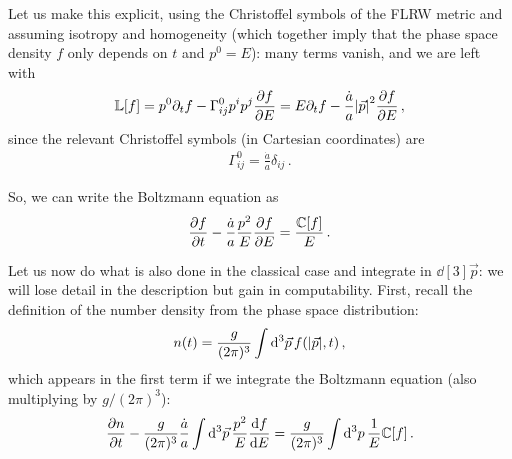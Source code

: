 \documentclass[main.tex]{subfiles}
\begin{document}
Let us make this explicit, using the Christoffel symbols of the FLRW metric and assuming isotropy and homogeneity (which together imply that the phase space density \(f\) only depends on \(t\) and \(p^{0} = E\)): many terms vanish, and we are left with
%
\begin{align}
\mathbb{L}[f]  
= p^{0} \partial_{t}f - \Gamma^{0}_{ij} p^{i} p^{j} \pdv{f}{E}
= E \partial_t f - \frac{\dot{a}}{a} \abs{\vec{p}}^2 \pdv{f}{E}
\,,
\end{align}
%
since the relevant Christoffel symbols (in Cartesian coordinates) are 
%
\begin{align}
  \Gamma^{0}_{ij } = \frac{\dot{a}}{a} \delta_{ij }
\,.
\end{align}

So, we can write the Boltzmann equation as 
%
\begin{align}
\pdv{f}{t} - \frac{\dot{a}}{a} \frac{p^2}{E} \pdv{f}{E} = \frac{\mathbb{C} [f]}{E}
\,.
\end{align}



Let us now do what is also done in the classical case and integrate in \(\dd[3]{\vec{p}}\): we will lose detail in the description but gain in computability.
First, recall the definition of the number density from the phase space distribution:
%
\begin{align}
  n(t) = \frac{g}{(2\pi )^3} \int  \dd[3]{\vec{p}} f(\abs{\vec{p}}, t) 
\,,
\end{align}
%
which appears in the first term if we integrate the Boltzmann equation (also multiplying by \(g / (2 \pi )^3\)):
%
\begin{align}
  \pdv{n}{t} - \frac{g}{(2 \pi )^3} \frac{\dot{a}}{a } \int  \dd[3]{\vec{p}} \frac{p^2}{E} \dv{f}{E} = \frac{g }{(2\pi )^3} \int  \dd[3]{p} \frac{1}{E} \mathbb{C} [f]  
\,.
\end{align}
%
\end{document}
